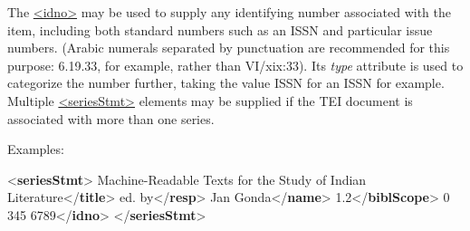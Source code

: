 \par
The \hyperref[TEI.idno]{<idno>} may be used to supply any identifying number associated with the item, including both standard numbers such as an ISSN and particular issue numbers. (Arabic numerals separated by punctuation are recommended for this purpose: 6.19.33, for example, rather than VI/xix:33). Its {\itshape type} attribute is used to categorize the number further, taking the value ISSN for an ISSN for example. Multiple \hyperref[TEI.seriesStmt]{<seriesStmt>} elements may be supplied if the TEI document is associated with more than one series.\par
Examples: \par\bgroup{}\exampleFont \begin{shaded}\noindent\mbox{}{<\textbf{seriesStmt}>}\mbox{}\newline 
{}Machine-Readable Texts for the Study of\mbox{}\newline 
\hspace*{1em}\hspace*{1em} Indian Literature{</\textbf{title}>}\mbox{}\newline 
{}\mbox{}\newline 
\hspace*{1em}ed. by{</\textbf{resp}>}\mbox{}\newline 
\hspace*{1em}Jan Gonda{</\textbf{name}>}\mbox{}\newline 
{}\mbox{}\newline 
{}1.2{</\textbf{biblScope}>}\mbox{}\newline 
{}0 345 6789{</\textbf{idno}>}\mbox{}\newline 
{</\textbf{seriesStmt}>}\end{shaded}\egroup\par \noindent 
